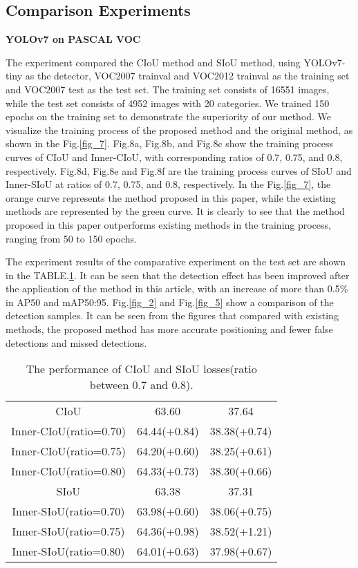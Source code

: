 \documentclass[lettersize,journal]{IEEEtran}
\begin{document}
	\subsection{Comparison Experiments}
	\par \textbf {YOLOv7 on PASCAL VOC}
	\par The experiment compared the CIoU\cite{ref3} method and SIoU\cite{ref5} method, using YOLOv7-tiny\cite{ref13} as the detector, VOC2007 trainval  and VOC2012 trainval as the training set and VOC2007 test as the test set\cite{ref20}. The training set consists of 16551 images, while the test set consists of 4952 images with 20 categories. We trained 150 epochs on the training set to demonstrate the superiority of our method. We visualize the training process of the proposed method and the original method, as shown in the Fig.\ref{fig_7}. Fig.8a, Fig.8b, and Fig.8c show the training process curves of CIoU and Inner-CIoU, with corresponding ratios of 0.7, 0.75, and 0.8, respectively. Fig.8d, Fig.8e and Fig.8f are the training process curves of SIoU and Inner-SIoU at ratios of 0.7, 0.75, and 0.8, respectively. In the Fig.\ref{fig_7}, the orange curve represents the method proposed in this paper, while the existing methods are represented by the green curve. It is clearly to see that the method proposed in this paper outperforms existing methods in the training process, ranging from 50 to 150 epochs.
	\par The experiment results of the comparative experiment on the test set are shown in the TABLE.\ref{tab:mytable1}. It can be seen that the detection effect has been improved after the application of the method in this article, with an increase of more than 0.5\% in AP50 and mAP50:95. Fig.\ref{fig_2} and Fig.\ref{fig_5} show a comparison of the detection samples. It can be seen from the figures that compared with existing methods, the proposed method has more accurate positioning and fewer false detections and missed detections.
	\newline
	\begin{table}[h]
		\centering
		\begin{tabular}{ccc}
			\toprule &  &  \\
			\midrule CIoU & 63.60 & 37.64 \\
			Inner-CIoU(ratio=0.70) & 64.44(+0.84) & 38.38(+0.74) \\
			Inner-CIoU(ratio=0.75) & 64.20(+0.60) & 38.25(+0.61) \\
			Inner-CIoU(ratio=0.80) & 64.33(+0.73) & 38.30(+0.66) \\
			\midrule SIoU & 63.38 & 37.31 \\
			Inner-SIoU(ratio=0.70) & 63.98(+0.60) & 38.06(+0.75) \\
			Inner-SIoU(ratio=0.75) & 64.36(+0.98) & 38.52(+1.21) \\
			Inner-SIoU(ratio=0.80) & 64.01(+0.63) & 37.98(+0.67) \\
			\bottomrule \end{tabular}
		\caption{The performance of CIoU and SIoU losses(ratio between 0.7 and 0.8).}
		\label{tab:mytable1}
	\end{table}
\end{document}

